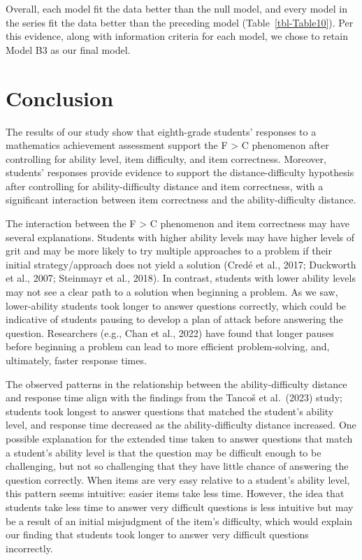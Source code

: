 \documentclass[
  number]{elsarticle}
\begin{document}
Overall, each model fit the data better than the null model, and every
model in the series fit the data better than the preceding model
(Table~\ref{tbl-Table10}). Per this evidence, along with information
criteria for each model, we chose to retain Model B3 as our final model.

\section{Conclusion}\label{conclusion}

The results of our study show that eighth-grade students' responses to a
mathematics achievement assessment support the F \textgreater{} C
phenomenon after controlling for ability level, item difficulty, and
item correctness. Moreover, students' responses provide evidence to
support the distance-difficulty hypothesis after controlling for
ability-difficulty distance and item correctness, with a significant
interaction between item correctness and the ability-difficulty
distance.

The interaction between the F \textgreater{} C phenomenon and item
correctness may have several explanations. Students with higher ability
levels may have higher levels of grit and may be more likely to try
multiple approaches to a problem if their initial strategy/approach does
not yield a solution (Credé et al., 2017; Duckworth et al., 2007;
Steinmayr et al., 2018). In contrast, students with lower ability levels
may not see a clear path to a solution when beginning a problem. As we
saw, lower-ability students took longer to answer questions correctly,
which could be indicative of students pausing to develop a plan of
attack before answering the question. Researchers (e.g., Chan et al.,
2022) have found that longer pauses before beginning a problem can lead
to more efficient problem-solving, and, ultimately, faster response
times.

The observed patterns in the relationship between the ability-difficulty
distance and response time align with the findings from the Tancoš et
al.~(2023) study; students took longest to answer questions that matched
the student's ability level, and response time decreased as the
ability-difficulty distance increased. One possible explanation for the
extended time taken to answer questions that match a student's ability
level is that the question may be difficult enough to be challenging,
but not so challenging that they have little chance of answering the
question correctly. When items are very easy relative to a student's
ability level, this pattern seems intuitive: easier items take less
time. However, the idea that students take less time to answer very
difficult questions is less intuitive but may be a result of an initial
misjudgment of the item's difficulty, which would explain our finding
that students took longer to answer very difficult questions
incorrectly.
\end{document}

